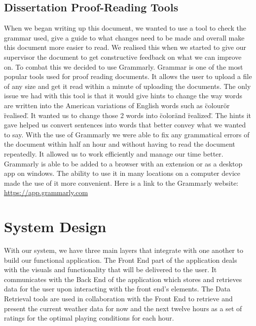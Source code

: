 \section{Dissertation Proof-Reading Tools}
When we began writing up this document, we wanted to use a tool to check the grammar used, give a guide to what changes need to be made and overall make this document more easier to read. We realised this when we started to give our supervisor the document to get constructive feedback on what we can improve on.  To combat this we decided to use Grammarly. \newline \newline
Grammar is one of the most popular tools used for proof reading documents.  It allows the user to upload a file of any size and get it read within a minute of uploading the documents. The only issue we had with this tool is that it would give hints to change the way words are written into the American variations of English words such as \"colour\" or \"realised\". It wanted us to change those 2 words into \"color\" and \"realized\". The hints it gave helped us convert sentences into words that better convey what we wanted to say.
\newline \newline
With the use of Grammarly we were able to fix any grammatical errors of the document within half an hour and without having to read the document repeatedly. It allowed us to work efficiently and manage our time better. Grammarly is able to be added to a browser with an extension or as a desktop app on windows. The ability to use it in many locations on a computer device made the use of it more convenient. \newline
Here is a link to the Grammarly website: {\url{https://app.grammarly.com}}
\chapter{System Design}
With our system, we have three main layers that integrate with one another to build our functional application. The Front End part of the application deals with the visuals and functionality that will be delivered to the user. It communicates with the Back End of the application which stores and retrieves data for the user upon interacting with the front end’s elements. The Data Retrieval tools are used in collaboration with the Front End to retrieve and present the current weather data for now and the next twelve hours as a set of ratings for the optimal playing conditions for each hour.
